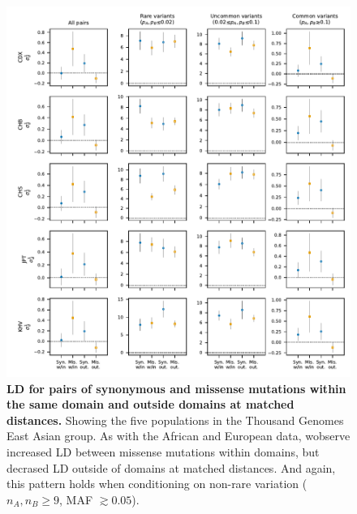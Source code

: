 \documentclass[]{article}
\begin{document}
\begin{figure}[ht!]
    \centering
    \includegraphics{../figures/data_domains_eas}
    \caption{
        \textbf{LD for pairs of synonymous and missense mutations within the
        same domain and outside domains at matched distances.}
        Showing the five populations in the Thousand Genomes East Asian group.
        As with the African and European data,
        wobserve increased LD between missense mutations within domains,
        but decrased LD outside of domains at matched distances. And again,
        this pattern holds when conditioning on non-rare variation
        (\(n_A, n_B \geq 9\), MAF \(\gtrsim 0.05\)).
    }
    \label{fig:domainsEAS}
\end{figure}
\end{document}

